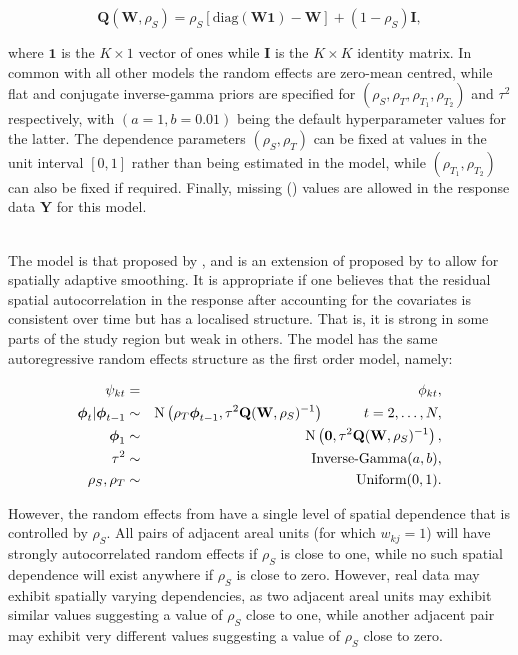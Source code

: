 \documentclass[article, nojss]{jss}
\newcommand{\bd}[1]{\ensuremath{\mbox{\boldmath $#1$}}}
\begin{document}
\begin{equation}
\mathbf{Q}(\mathbf{W},\rho_S)=\rho_S[\mbox{diag}(\mathbf{W}\mathbf{1}) - \mathbf{W}] + (1-\rho_S)\mathbf{I},\label{Lerouxjoint}
\end{equation}

where $\mathbf{1}$ is the $K\times 1$ vector of ones while $\mathbf{I}$ is the $K\times K$ identity matrix. In common with all other models the random effects are zero-mean centred, while flat and conjugate inverse-gamma priors are specified for $(\rho_S, \rho_T, \rho_{T_1}, \rho_{T_2})$ and $\tau^2$ respectively, with $(a=1, b=0.01)$ being the default hyperparameter values for the latter. The  dependence parameters $(\rho_{S}, \rho_{T})$ can be fixed at values in the unit interval $[0,1]$ rather than being estimated in the model, while $(\rho_{T_1}, \rho_{T_2})$ can also be fixed if required. Finally, missing () values are allowed in the response data $\mathbf{Y}$ for this model.\vspace{1cm}


\\
The model is that proposed by \cite{rushworth2016}, and is an extension of  proposed by \cite{rushworth2014} to allow for spatially adaptive smoothing. It is appropriate if one believes that the residual spatial autocorrelation in the response after accounting for the covariates is consistent over time but has a localised structure. That is, it is strong in some parts of the study region but weak in others. The model has the same autoregressive random effects structure as the first order   model, namely:

\begin{eqnarray}
\psi_{kt}&=&\phi_{kt},\label{caradaptive1}\\
\bd{\phi}_t|\bd{\phi}_{t-1} & \sim & \mbox{N}\left(\rho_T\bd{\phi}_{t-1}, \tau^{2} \mathbf{Q}(\mathbf{W},\rho_S)^{-1}\right)\hspace{1cm} t=2,\ldots,N,\nonumber\\
\bd{\phi}_1 & \sim & \mbox{N}\left(\mathbf{0}, \tau^{2} \mathbf{Q}(\mathbf{W},\rho_S)^{-1}\right),\nonumber\\
\tau^2&\sim&\mbox{Inverse-Gamma}(a,b),\nonumber\\
\rho_S,\rho_T&\sim&\mbox{Uniform}(0,1).\nonumber
\end{eqnarray}


However, the random effects from   have a single level of spatial dependence that is controlled by $\rho_S$. All pairs of adjacent areal units (for which $w_{kj}=1$) will have strongly autocorrelated random effects if $\rho_S$ is close to one, while no such spatial dependence will exist anywhere if $\rho_S$ is close to zero. However, real data may exhibit spatially varying dependencies, as two adjacent areal units may exhibit similar values suggesting a value of $\rho_S$ close to one, while another adjacent pair may exhibit very different values suggesting a value of $\rho_S$ close to zero.
\end{document}
